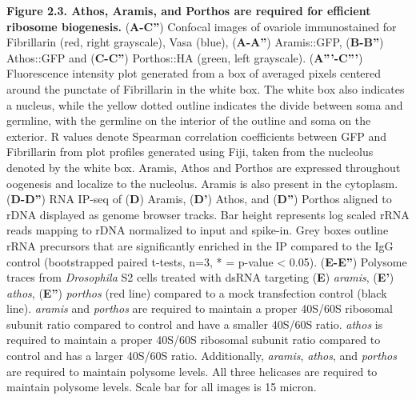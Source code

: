 \documentclass[12pt,oneside]{reedthesis}
\begin{document}
\textbf{Figure 2.3. Athos, Aramis, and Porthos are required for efficient
ribosome biogenesis.} (\textbf{A-C''}) Confocal images of ovariole
immunostained for Fibrillarin (red, right grayscale), Vasa (blue),
(\textbf{A-A''}) Aramis::GFP, (\textbf{B-B''}) Athos::GFP and (\textbf{C-C''})
Porthos::HA (green, left grayscale). (\textbf{A'''-C'''}) Fluorescence
intensity plot generated from a box of averaged pixels centered around
the punctate of Fibrillarin in the white box. The white box also
indicates a nucleus, while the yellow dotted outline indicates the
divide between soma and germline, with the germline on the interior of
the outline and soma on the exterior. R values denote Spearman
correlation coefficients between GFP and Fibrillarin from plot profiles
generated using Fiji, taken from the nucleolus denoted by the white box.
Aramis, Athos and Porthos are expressed throughout oogenesis and
localize to the nucleolus. Aramis is also present in the cytoplasm.
(\textbf{D-D''}) RNA IP-seq of (\textbf{D}) Aramis, (\textbf{D'}) Athos, and (\textbf{D''})
Porthos aligned to rDNA displayed as genome browser tracks. Bar height
represents log scaled rRNA reads mapping to rDNA normalized to input and
spike-in. Grey boxes outline rRNA precursors that are significantly
enriched in the IP compared to the IgG control (bootstrapped paired
t-tests, n=3, * = p-value \textless{} 0.05). (\textbf{E-E''}) Polysome traces from
\emph{Drosophila} S2 cells treated with dsRNA targeting (\textbf{E}) \emph{aramis},
(\textbf{E'}) \emph{athos}, (\textbf{E''}) \emph{porthos} (red line) compared to a mock
transfection control (black line). \emph{aramis} and \emph{porthos} are required
to maintain a proper 40S/60S ribosomal subunit ratio compared to control
and have a smaller 40S/60S ratio. \emph{athos} is required to maintain a
proper 40S/60S ribosomal subunit ratio compared to control and has a
larger 40S/60S ratio. Additionally, \emph{aramis}, \emph{athos}, and \emph{porthos} are
required to maintain polysome levels. All three helicases are required
to maintain polysome levels. Scale bar for all images is 15 micron.

\textbf{\hfill\break
}
\end{document}
